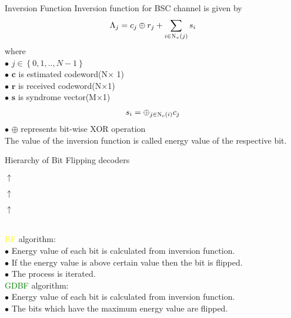 \documentclass{beamer}
\providecommand{\cbrak}[1]{\ensuremath{\left\{#1\right\}}}
\begin{document}
\begin{frame}{Inversion Function}
Inversion function for BSC channel is given by
 \begin{align}
     \Lambda_j=c_j\oplus r_j +\sum_{i\in \textsc{N}_v(j)}s_i
 \end{align}
 where\\
 $\bullet$ $j\in \cbrak{0,1,..,N-1}$\\
 $\bullet$ $\textbf{c}$ is estimated codeword(N$\times$ 1)\\
 $\bullet$ $\textbf{r}$ is received codeword(N$\times $1)\\
 $\bullet$ $\textbf{s}$ is syndrome vector(M$\times$1)
 \begin{align}
     s_i=\oplus_{j\in \textsc{N}_c(i)} c_j
 \end{align}
 $\bullet$ $\oplus$ represents bit-wise XOR operation\\
 The value of the inversion function is called energy value of the respective bit.
 \end{frame}
 \begin{frame}{Hierarchy of Bit Flipping decoders}
 \begin{center}
     
 
\framebox[\width]{\textcolor{red}{T-PGDBF}} \par
$\uparrow$\\
\framebox[\width]{\textcolor{blue}{PGDBF}} \par
$\uparrow$\\
\framebox[\width]{\textcolor{green}{GDBF}} \par
$\uparrow$\\
\framebox[\width]{\textcolor{yellow}{BF}}\\
\end{center} 
 
\textcolor{yellow}{BF} algorithm:\\
$\bullet$ Energy value of each bit is calculated from inversion function.\\
$\bullet$ If the energy value is above certain value then the bit is flipped.\\
$\bullet$ The process is iterated.\\
\textcolor{green}{GDBF} algorithm:\\
$\bullet$ Energy value of each bit is calculated from inversion function.\\
$\bullet$ The bits which have the maximum energy value are flipped.\\
\end{frame}
\end{document}
